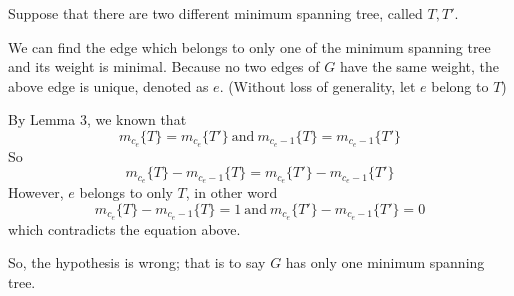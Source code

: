 Suppose that there are two different minimum spanning tree, called $T,T'$.\par

We can find the edge which belongs to only one of the minimum spanning tree and its weight is minimal.
Because no two edges of $G$ have the same weight, the above edge is unique, denoted as $e$.
(Without loss of generality, let $e$ belong to $T$)\par

By Lemma 3, we known that \[m_{c_e}\{T\} = m_{c_e}\{T'\}~\text{and}~m_{c_e - 1}\{T\} = m_{c_e - 1}\{T'\}\]
So \[m_{c_e}\{T\} -  m_{c_e - 1}\{T\} = m_{c_e}\{T'\} - m_{c_e - 1}\{T'\}\]
However, $e$ belongs to only $T$, in other word \[m_{c_e}\{T\} -  m_{c_e - 1}\{T\} = 1~\text{and}~ m_{c_e}\{T'\} - m_{c_e - 1}\{T'\} = 0\] which contradicts the equation above.\par
So, the hypothesis is wrong; that is to say $G$ has only one minimum spanning tree.
